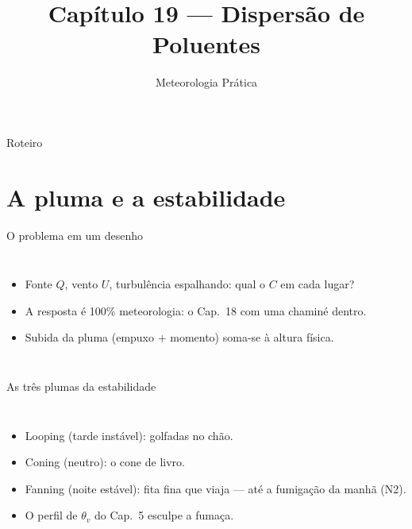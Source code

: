 \documentclass[aspectratio=169,11pt]{beamer}
\title[Cap. 19 --- Dispersão]{Capítulo 19 --- Dispersão de Poluentes}
\subtitle{Meteorologia Prática}
\author{}
\date{}
\begin{document}
\begin{frame}
  \titlepage
  \vfill
  \atribuicao
\end{frame}

\begin{frame}{Roteiro}
  \tableofcontents
\end{frame}

\section{A pluma e a estabilidade}

\begin{frame}{O problema em um desenho}
  \begin{columns}
    \begin{itemize}
      \item Fonte $Q$, vento $U$, turbulência espalhando: qual o $C$
            em cada lugar?
      \item A resposta é 100\% meteorologia: o Cap.~18 com uma
            chaminé dentro.
      \item Subida da pluma (empuxo $+$ momento) soma-se à altura
            física.
    \end{itemize}
  \end{columns}
\end{frame}

\begin{frame}{As três plumas da estabilidade}
  \begin{columns}
    \begin{itemize}
      \item \alert{Looping} (tarde instável): golfadas no chão.
      \item \alert{Coning} (neutro): o cone de livro.
      \item \alert{Fanning} (noite estável): fita fina que viaja —
            até a fumigação da manhã (N2).
      \item O perfil de $\theta_v$ do Cap.~5 esculpe a fumaça.
    \end{itemize}
  \end{columns}
\end{frame}
\end{document}
